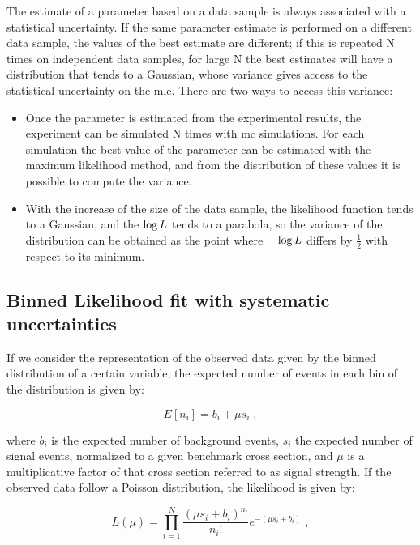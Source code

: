 The estimate of a parameter based on a data sample is always associated with a statistical uncertainty.
If the same parameter estimate is performed on a different data sample, the values of the best estimate are different;
if this is repeated N times on independent data samples, for large N the best estimates will have a distribution that tends to a Gaussian, 
whose variance gives access to the statistical uncertainty on the \gls{mle}. There are two ways to access this variance:

\begin{itemize}

\item Once the parameter is estimated from the experimental results, the experiment can be simulated N times with \gls{mc}  simulations. For each simulation the best value of the parameter can be estimated with the maximum likelihood method, and from the distribution of these values it is possible to compute the variance.

\item With the increase of the size of the data sample, the likelihood function tends to a Gaussian, and the $\log{L}$ tends to a parabola, so the variance of the distribution can be obtained as the point where $-\log{L}$ differs by $\frac{1}{2}$ with respect to its minimum.

\end{itemize}


\subsection{Binned Likelihood fit with systematic uncertainties}

If we consider the representation of the observed data given by the binned distribution of a certain variable, the expected number of events in each bin of the distribution is given by:

\begin{equation}
\label{eq:stat:exp}
E[n_i] = b_i + \mu s_i  \; ,
\end{equation}

\noindent where $b_i$ is the expected number of background events, $s_i$ the expected number of signal events, normalized to a given benchmark cross section, and $\mu$ is a multiplicative factor of that cross section referred to as signal strength.
If the observed data follow a Poisson distribution, the likelihood is given by:

\begin{equation}
\label{eq:stat:lik_no_sys}
L(\mu) =
\prod_{i=1}^N \frac{ (\mu s_{i} +
b_{i} )^{n_{i}} }{ n_{i}! }
e^{- (\mu s_{i} + b_{i}) } \; ,
\end{equation}

